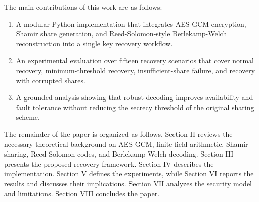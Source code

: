 The main contributions of this work are as follows:
\begin{enumerate}
\item A modular Python implementation that integrates AES-GCM encryption, Shamir share generation, and Reed-Solomon-style Berlekamp-Welch reconstruction into a single key recovery workflow.
\item An experimental evaluation over fifteen recovery scenarios that cover normal recovery, minimum-threshold recovery, insufficient-share failure, and recovery with corrupted shares.
\item A grounded analysis showing that robust decoding improves availability and fault tolerance without reducing the secrecy threshold of the original sharing scheme.
\end{enumerate}

The remainder of the paper is organized as follows. Section II reviews the necessary theoretical background on AES-GCM, finite-field arithmetic, Shamir sharing, Reed-Solomon codes, and Berlekamp-Welch decoding. Section III presents the proposed recovery framework. Section IV describes the implementation. Section V defines the experiments, while Section VI reports the results and discusses their implications. Section VII analyzes the security model and limitations. Section VIII concludes the paper.
